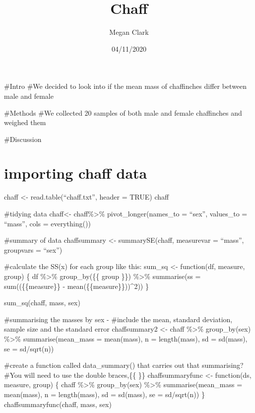 \documentclass[
]{article}
\title{Chaff}
\author{Megan Clark}
\date{04/11/2020}
\begin{document}
\maketitle

{
\setcounter{tocdepth}{2}
\tableofcontents
}
\#Intro
\#We decided to look into if the mean mass of chaffinches differ between male and female

\#Methods
\#We collected 20 samples of both male and female chaffinches and weighed them

\#Discussion

\hypertarget{importing-chaff-data}{%
\section{importing chaff data}\label{importing-chaff-data}}

chaff \textless- read.table(``chaff.txt'', header = TRUE)
chaff

\#tidying data
chaff\textless- chaff\%\textgreater\%
pivot\_longer(names\_to = ``sex'',
values\_to = ``mass'',
cols = everything())

\#summary of data
chaffsummary \textless- summarySE(chaff, measurevar = ``mass'',
groupvars = ``sex'')

\#calculate the SS(x) for each group like this:
sum\_sq \textless- function(df, measure, group) \{
df \%\textgreater\% group\_by(\{\{ group \}\}) \%\textgreater\%
summarise(ss = sum((\{\{measure\}\} - mean(\{\{measure\}\}))\^{}2))
\}

sum\_sq(chaff, mass, sex)

\#summarising the masses by sex -
\#include the mean, standard deviation, sample size and the standard error
chaffsummary2 \textless- chaff \%\textgreater\%
group\_by(sex) \%\textgreater\%
summarise(mean\_mass = mean(mass),
n = length(mass),
sd = sd(mass),
se = sd/sqrt(n))

\#create a function called data\_summary() that carries out that summarising?
\#You will need to use the double braces,\{\{ \}\}
chaffsummaryfunc \textless- function(ds, measure, group) \{
chaff \%\textgreater\% group\_by(sex) \%\textgreater\%
summarise(mean\_mass = mean(mass),
n = length(mass),
sd = sd(mass),
se = sd/sqrt(n))
\}
chaffsummaryfunc(chaff, mass, sex)
\end{document}
